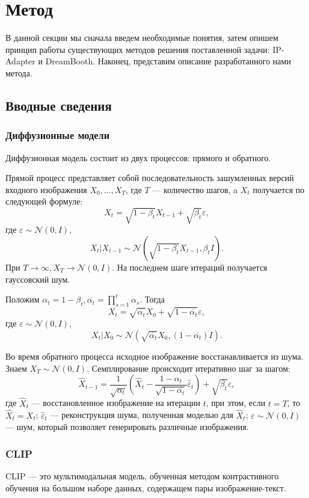 \documentclass{article}
\begin{document}
\section{Метод}
В данной секции мы сначала введем необходимые понятия, затем опишем принцип работы существующих методов решения поставленной задачи: IP-Adapter и DreamBooth. Наконец, представим описание разработанного нами метода.
\subsection{Вводные сведения}
\subsubsection{Диффузионные модели}
Диффузионная модель состоит из двух процессов: прямого и обратного.

Прямой процесс представляет собой последовательность зашумленных версий входного изображения $X_0, \dots, X_T$, где $T$ --- количество шагов, a $X_t$ получается по следующей формуле: $$X_t = \sqrt{1-\beta_t}X_{t-1}+\sqrt{\beta_t}\varepsilon,$$ где $\varepsilon \sim \mathcal{N}(0, I)$, $$X_t|X_{t-1} \sim \mathcal{N}(\sqrt{1-\beta_t}X_{t-1}, \beta_t I).$$ При $T \rightarrow \infty, X_T \rightarrow \mathcal{N}(0, I).$ На последнем шаге итераций получается гауссовский шум. 

Положим $\alpha_t=1-\beta_t, \overline{\alpha_t} = \prod\limits_{s = 1}^t\alpha_s$. Тогда $$X_t = \sqrt{\overline{\alpha_t}}X_0+\sqrt{1-\overline{\alpha_t}}\varepsilon,$$ где $\varepsilon \sim \mathcal{N}(0, I)$, $$X_t|X_0 \sim \mathcal{N}(\sqrt{\overline{\alpha_t}}X_0, (1-\overline{\alpha_t}) I).$$

Во время обратного процесса исходное изображение восстанавливается из шума. Знаем $X_T\sim \mathcal{N}(0, I)$. Семплирование происходит итеративно шаг за шагом: $$\hat{X}_{t-1} = \frac{1}{\sqrt{\alpha_t}}\left( \hat{X}_t - \frac{1-\alpha_t}{\sqrt{1-\overline{\alpha_t}}}\hat{\varepsilon}_t\right) + \sqrt{\beta_t}\varepsilon,$$ где $\hat{X}_t$ --- восстановленное изображение на итерации $t$, при этом, если $t = T$, то $\hat{X}_t = X_t$; $\hat{\varepsilon}_t$ --- реконструкция шума, полученная моделью для $\hat{X}_t$; $\varepsilon \sim \mathcal{N}(0, I)$ --- шум, который позволяет генерировать различные изображения. 

\subsubsection{CLIP}
CLIP --- это мультимодальная модель, обученная методом контрастивного обучения на большом наборе данных, содержащем пары изображение-текст. 
\end{document}
